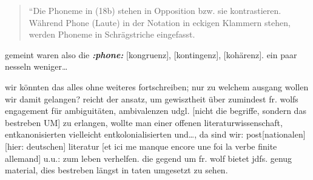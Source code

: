 \documentclass[
  letterpaper,
  DIV=11,
  numbers=noendperiod]{scrartcl}
\begin{document}
\begin{quote}
``Die Phoneme in (18b) stehen in Opposition bzw. sie kontrastieren.
Während Phone (Laute) in der Notation in eckigen Klammern stehen, werden
Phoneme in Schrägstriche eingefasst.
\end{quote}

gemeint waren also die \textbf{\emph{:phone:}} {[}kongruenz{]},
{[}kontingenz{]}, {[}kohärenz{]}. ein paar nesseln weniger\ldots{}

wir könnten das alles ohne weiteres fortschreiben; nur zu welchem
ausgang wollen wir damit gelangen? reicht der ansatz, um gewisztheit
über zumindest fr. wolfs engagement für ambiguitäten, ambivalenzen udgl.
{[}nicht die begriffe, sondern das bestreben UM{]} zu erlangen, wollte
man einer offenen literaturwissenschaft, entkanonisierten vielleicht
entkolonialisierten und\ldots, da sind wir: post{[}nationalen{]}{[}hier:
deutschen{]} literatur {[}et ici me manque encore une foi la verbe
finite allemand{]} u.u.: zum leben verhelfen. die gegend um fr. wolf
bietet jdfs. genug material, dies bestreben längst in taten umgesetzt zu
sehen.
\end{document}
